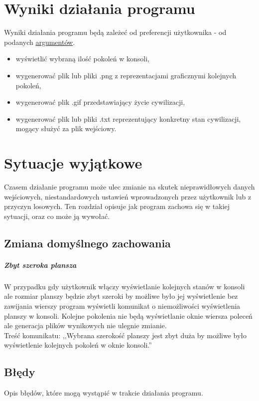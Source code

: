 \documentclass{report}
\begin{document}
\chapter{Wyniki działania programu}
Wyniki działania programu będą zależeć od preferencji użytkownika -  od podanych \hyperref[argumenty]{\textcolor{LinkColor}{argumentów}}. 
\begin{itemize}
\item wyświetlić wybraną ilość pokoleń w konsoli,
\item wygenerować plik lub pliki .png z reprezentacjami graficznymi kolejnych pokoleń,
\item wygenerować plik .gif przedstawiający życie cywilizacji,
\item wygenerować plik lub pliki .txt reprezentujący konkretny stan cywilizacji, mogący służyć za plik wejściowy.
\end{itemize}

\chapter{Sytuacje wyjątkowe}
Czasem działanie programu może ulec zmianie na skutek nieprawidłowych danych wejściowych, niestandardowych ustawień wprowadzonych przez użytkownik lub z przyczyn losowych. Ten rozdział opisuje jak program zachowa się w takiej sytuacji, oraz co może ją wywołać.

\section{Zmiana domyślnego zachowania}
\paragraph{Zbyt szeroka plansza}
W przypadku gdy użytkownik włączy wyświetlanie kolejnych stanów w konsoli ale rozmiar planszy będzie zbyt szeroki by możliwe było jej wyświetlenie bez zawijania wierszy program wyświetli komunikat o niemożliwości wyświetlenia planszy w konsoli. Kolejne pokolenia nie będą wyświetlanie oknie wiersza poleceń ale generacja plików wynikowych nie ulegnie zmianie. \\
Treść komunikatu: ,,Wybrana szerokość planszy jest zbyt duża by możliwe było wyświetlenie kolejnych pokoleń w oknie konsoli.''

\section{Błędy}
Opis błędów, które mogą wystąpić w trakcie działania programu.
\end{document}
